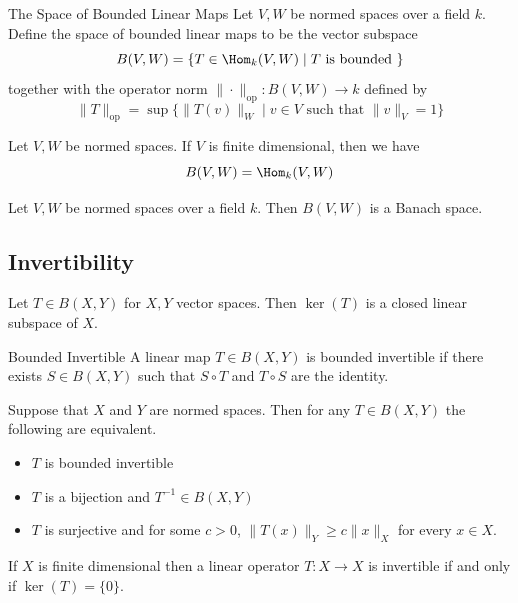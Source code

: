 \documentclass[a4paper]{article}
\begin{document}
\begin{defn}{The Space of Bounded Linear Maps}{} Let $V,W$ be normed spaces over a field $k$. Define the space of bounded linear maps to be the vector subspace $$B(V,W)=\{T\in\Hom_k(V,W)\;|\;T\text{ is bounded }\}$$ together with the operator norm $\|\cdot\|_{\text{op}}:B(V,W)\to k$ defined by $$\|T\|_{\text{op}}=\sup\{\|T(v)\|_W\;|\;v\in V\text{ such that }\|v\|_V=1\}$$
\end{defn}

\begin{lmm}{}{} Let $V,W$ be normed spaces. If $V$ is finite dimensional, then we have $$B(V,W)=\Hom_k(V,W)$$
\end{lmm}

\begin{lmm}{}{} Let $V,W$ be normed spaces over a field $k$. Then $B(V,W)$ is a Banach space. 
\end{lmm}

\subsection{Invertibility}
\begin{crl}{}{} Let $T\in B(X,Y)$ for $X,Y$ vector spaces. Then $\ker(T)$ is a closed linear subspace of $X$. 
\end{crl}

\begin{defn}{Bounded Invertible}{} A linear map $T\in B(X,Y)$ is bounded invertible if there exists $S\in B(X,Y)$ such that $S\circ T$ and $T\circ S$ are the identity. 
\end{defn}

\begin{lmm}{}{} Suppose that $X$ and $Y$ are normed spaces. Then for any $T\in B(X,Y)$ the following are equivalent. 
\begin{itemize}
\item $T$ is bounded invertible
\item $T$ is a bijection and $T^{-1}\in B(X,Y)$
\item $T$ is surjective and for some $c>0$, $\|T(x)\|_Y\geq c\|x\|_X$ for every $x\in X$. 
\end{itemize}
\end{lmm}

\begin{crl}{}{} If $X$ is finite dimensional then a linear operator $T:X\to X$ is invertible if and only if $\ker(T)=\{0\}$. 
\end{crl}
\end{document}

